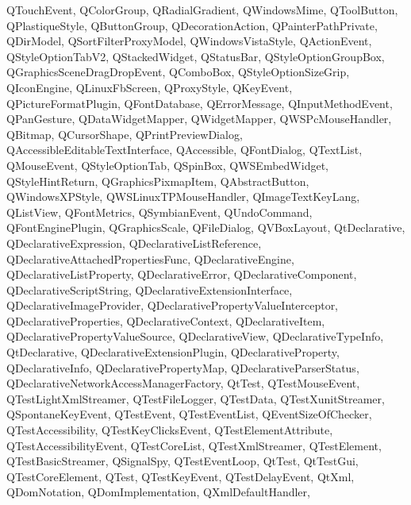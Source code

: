 {{    QTouchEvent,%
    QColorGroup,%
    QRadialGradient,%
    QWindowsMime,%
    QToolButton,%
    QPlastiqueStyle,%
    QButtonGroup,%
    QDecorationAction,%
    QPainterPathPrivate,%
    QDirModel,%
    QSortFilterProxyModel,%
    QWindowsVistaStyle,%
    QActionEvent,%
    QStyleOptionTabV2,%
    QStackedWidget,%
    QStatusBar,%
    QStyleOptionGroupBox,%
    QGraphicsSceneDragDropEvent,%
    QComboBox,%
    QStyleOptionSizeGrip,%
    QIconEngine,%
    QLinuxFbScreen,%
    QProxyStyle,%
    QKeyEvent,%
    QPictureFormatPlugin,%
    QFontDatabase,%
    QErrorMessage,%
    QInputMethodEvent,%
    QPanGesture,%
    QDataWidgetMapper,%
    QWidgetMapper,%
    QWSPcMouseHandler,%
    QBitmap,%
    QCursorShape,%
    QPrintPreviewDialog,%
    QAccessibleEditableTextInterface,%
    QAccessible,%
    QFontDialog,%
    QTextList,%
    QMouseEvent,%
    QStyleOptionTab,%
    QSpinBox,%
    QWSEmbedWidget,%
    QStyleHintReturn,%
    QGraphicsPixmapItem,%
    QAbstractButton,%
    QWindowsXPStyle,%
    QWSLinuxTPMouseHandler,%
    QImageTextKeyLang,%
    QListView,%
    QFontMetrics,%
    QSymbianEvent,%
    QUndoCommand,%
    QFontEnginePlugin,%
    QGraphicsScale,%
    QFileDialog,%
    QVBoxLayout,%
    QtDeclarative,%
    QDeclarativeExpression,%
    QDeclarativeListReference,%
    QDeclarativeAttachedPropertiesFunc,%
    QDeclarativeEngine,%
    QDeclarativeListProperty,%
    QDeclarativeError,%
    QDeclarativeComponent,%
    QDeclarativeScriptString,%
    QDeclarativeExtensionInterface,%
    QDeclarativeImageProvider,%
    QDeclarativePropertyValueInterceptor,%
    QDeclarativeProperties,%
    QDeclarativeContext,%
    QDeclarativeItem,%
    QDeclarativePropertyValueSource,%
    QDeclarativeView,%
    QDeclarativeTypeInfo,%
    QtDeclarative,%
    QDeclarativeExtensionPlugin,%
    QDeclarativeProperty,%
    QDeclarativeInfo,%
    QDeclarativePropertyMap,%
    QDeclarativeParserStatus,%
    QDeclarativeNetworkAccessManagerFactory,%
    QtTest,%
    QTestMouseEvent,%
    QTestLightXmlStreamer,%
    QTestFileLogger,%
    QTestData,%
    QTestXunitStreamer,%
    QSpontaneKeyEvent,%
    QTestEvent,%
    QTestEventList,%
    QEventSizeOfChecker,%
    QTestAccessibility,%
    QTestKeyClicksEvent,%
    QTestElementAttribute,%
    QTestAccessibilityEvent,%
    QTestCoreList,%
    QTestXmlStreamer,%
    QTestElement,%
    QTestBasicStreamer,%
    QSignalSpy,%
    QTestEventLoop,%
    QtTest,%
    QtTestGui,%
    QTestCoreElement,%
    QTest,%
    QTestKeyEvent,%
    QTestDelayEvent,%
    QtXml,%
    QDomNotation,%
    QDomImplementation,%
    QXmlDefaultHandler,%
}}
